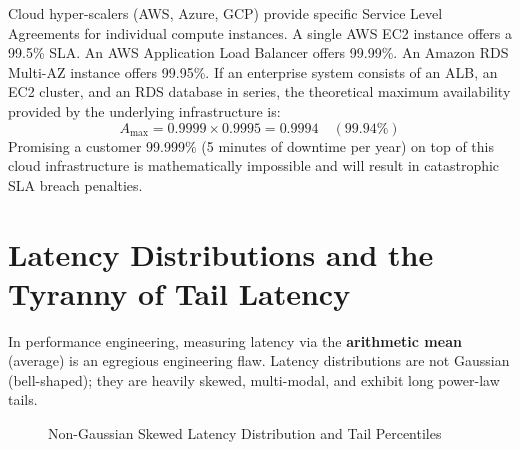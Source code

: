 \begin{productionwarningbox}
Cloud hyper-scalers (AWS, Azure, GCP) provide specific Service Level Agreements for individual compute instances. A single AWS EC2 instance offers a 99.5\% SLA. An AWS Application Load Balancer offers 99.99\%. An Amazon RDS Multi-AZ instance offers 99.95\%. If an enterprise system consists of an ALB, an EC2 cluster, and an RDS database in series, the theoretical maximum availability provided by the underlying infrastructure is:
$$A_{\text{max}} = 0.9999 \times 0.9995 = 0.9994 \quad (99.94\%)$$
Promising a customer 99.999\% (5 minutes of downtime per year) on top of this cloud infrastructure is mathematically impossible and will result in catastrophic SLA breach penalties.
\end{productionwarningbox}

\section{Latency Distributions and the Tyranny of Tail Latency}

In performance engineering, measuring latency via the \textbf{arithmetic mean} (average) is an egregious engineering flaw. Latency distributions are not Gaussian (bell-shaped); they are heavily skewed, multi-modal, and exhibit long power-law tails.

\begin{figure}[htbp]
\centering
{}
\caption{Non-Gaussian Skewed Latency Distribution and Tail Percentiles}
\label{fig:latency-distribution}
\end{figure}

